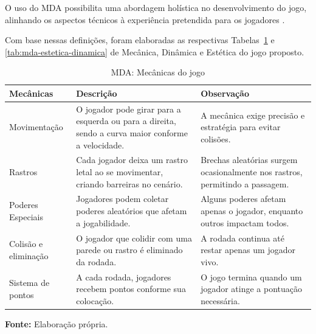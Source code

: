 O uso do MDA possibilita uma abordagem holística no desenvolvimento do jogo, alinhando os aspectos técnicos à experiência pretendida para os jogadores \cite{carroll2000}.

Com base nessas definições, foram elaboradas as respectivas Tabelas~\ref{tab:mecanicas} e \ref{tab:mda-estetica-dinamica} de Mecânica, Dinâmica e Estética do jogo proposto.

\begin{table}[H]
\centering
\caption{MDA: Mecânicas do jogo}
\label{tab:mecanicas}
\begin{tabularx}{\textwidth}{|l|X|X|}
\hline
\textbf{Mecânicas} & \textbf{Descrição} & \textbf{Observação} \\
\hline
Movimentação & O jogador pode girar para a esquerda ou para a direita, sendo a curva maior conforme a velocidade. & A mecânica exige precisão e estratégia para evitar colisões. \\
\hline
Rastros & Cada jogador deixa um rastro letal ao se movimentar, criando barreiras no cenário. & Brechas aleatórias surgem ocasionalmente nos rastros, permitindo a passagem. \\
\hline
Poderes Especiais & Jogadores podem coletar poderes aleatórios que afetam a jogabilidade. & Alguns poderes afetam apenas o jogador, enquanto outros impactam todos. \\
\hline
Colisão e eliminação & O jogador que colidir com uma parede ou rastro é eliminado da rodada. & A rodada continua até restar apenas um jogador vivo. \\
\hline
Sistema de pontos & A cada rodada, jogadores recebem pontos conforme sua colocação. & O jogo termina quando um jogador atinge a pontuação necessária. \\
\hline
\end{tabularx}

\vspace{0.3em}
\small \textbf{Fonte:} Elaboração própria.
\end{table}


